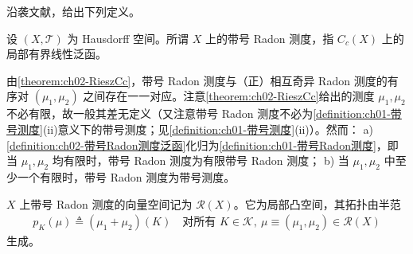 \documentclass[../../main.tex]{subfiles}%
\begin{document}
沿袭文献\cite{ref24}，给出下列定义。

\begin{definition}\label{definition:ch02-带号Radon测度泛函}
设 $(X,\mathscr T)$ 为 Hausdorff 空间。所谓 $X$ 上的带号 Radon 测度，指 $C_c(X)$ 上的局部有界线性泛函。
\end{definition}

\begin{remark}\label{remark:ch02-带号Radon注}
\label{remark:ch02-带号约化}
\label{remark:ch02-RN注}
由\cref{theorem:ch02-RieszCc}，带号 Radon 测度与（正）相互奇异 Radon 测度的有序对 $(\mu_1,\mu_2)$ 之间存在一一对应。注意\cref{theorem:ch02-RieszCc}给出的测度 $\mu_1,\mu_2$ 不必有限，故一般其差无定义（又注意带号 Radon 测度不必为\cref{definition:ch01-带号测度}(ii)意义下的带号测度；见\cref{definition:ch01-带号测度}(ii)）。然而：
a) \cref{definition:ch02-带号Radon测度泛函}化归为\cref{definition:ch01-带号Radon测度}，即当 $\mu_1,\mu_2$ 均有限时，带号 Radon 测度为有限带号 Radon 测度；
b) 当 $\mu_1,\mu_2$ 中至少一个有限时，带号 Radon 测度为带号测度。
\end{remark}

$X$ 上带号 Radon 测度的向量空间记为 $\mathscr R(X)$。它为局部凸空间，其拓扑由半范
\begin{align*}
p_K(\mu)\triangleq (\mu_1+\mu_2)(K)\quad\text{对所有 }K\in\mathscr K,\ \mu\equiv(\mu_1,\mu_2)\in\mathscr R(X)
\end{align*}
生成。
\end{document}
